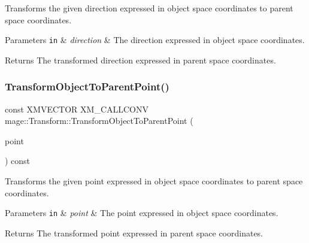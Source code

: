 Transforms the given direction expressed in object space coordinates to parent space coordinates.


\begin{DoxyParams}[1]{Parameters}
\mbox{\tt in}  & {\em direction} & The direction expressed in object space coordinates. \\
\hline
\end{DoxyParams}
\begin{DoxyReturn}{Returns}
The transformed direction expressed in parent space coordinates. 
\end{DoxyReturn}
\hypertarget{classmage_1_1_transform_a2d93dac4ae0b5b2723d2fbce077da85f}{}\label{classmage_1_1_transform_a2d93dac4ae0b5b2723d2fbce077da85f} 
\subsubsection{\texorpdfstring{Transform\+Object\+To\+Parent\+Point()}{TransformObjectToParentPoint()}}
{\footnotesize\ttfamily const X\+M\+V\+E\+C\+T\+OR X\+M\+\_\+\+C\+A\+L\+L\+C\+O\+NV mage\+::\+Transform\+::\+Transform\+Object\+To\+Parent\+Point (\begin{DoxyParamCaption}\item[{F\+X\+M\+V\+E\+C\+T\+OR}]{point }\end{DoxyParamCaption}) const\hspace{0.3cm}{\ttfamily [noexcept]}}

Transforms the given point expressed in object space coordinates to parent space coordinates.


\begin{DoxyParams}[1]{Parameters}
\mbox{\tt in}  & {\em point} & The point expressed in object space coordinates. \\
\hline
\end{DoxyParams}
\begin{DoxyReturn}{Returns}
The transformed point expressed in parent space coordinates. 
\end{DoxyReturn}
\hypertarget{classmage_1_1_transform_a305841f6bbc0a4eadaacbce2918b438c}{}\label{classmage_1_1_transform_a305841f6bbc0a4eadaacbce2918b438c} 
